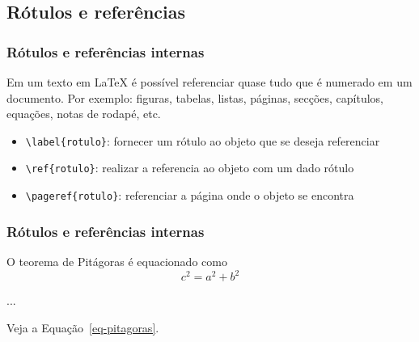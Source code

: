 \subsection{Rótulos e referências}

\begin{frame}[fragile]
\frametitle{Rótulos e referências internas}
Em um texto em \LaTeX{} é possível referenciar quase tudo que é numerado em um documento.
Por exemplo: figuras, tabelas, listas, páginas, secções, capítulos, equações, notas de rodapé, etc.
\pause

\vspace{3ex}
\begin{itemize}[<+->]
\item \verb|\label{rotulo}|: fornecer um rótulo ao objeto que se deseja referenciar
\item \verb|\ref{rotulo}|: realizar a referencia ao objeto com um dado rótulo
\item \verb|\pageref{rotulo}|: referenciar a página onde o objeto se encontra
\end{itemize}

\end{frame}


\begin{frame}[fragile]
\frametitle{Rótulos e referências internas}
\begin{LTXexample}
O teorema de Pit\'agoras \'e equacionado como
\begin{equation}
\label{eq-pitagoras}
c^2 = a^2 + b^2
\end{equation}

...

Veja a Equa\c{c}\~ao~\ref{eq-pitagoras}.
\end{LTXexample}
\end{frame}

